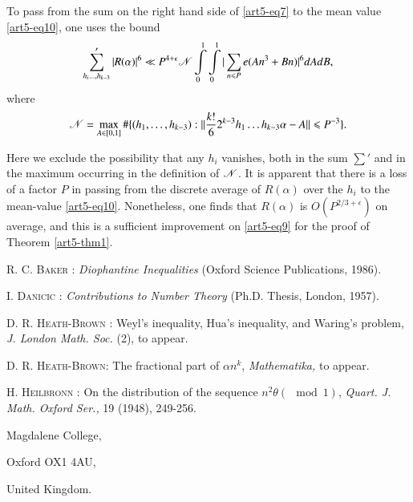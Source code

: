 To pass from the sum on the right hand side of \eqref{art5-eq7} to the mean value \eqref{art5-eq10}, one uses the bound
$$
\sum\limits'_{h_i \ldots, h_{k-3}} |R(\alpha)|^6 \ll P^{4 +\epsilon} \mathscr{N} \int\limits^1_0 \int\limits^1_0 |\sum\limits_{n\leqslant P} e (An^3 + Bn)|^6 d A d B,
$$
where 
$$
\mathscr{N} = \max\limits_{A \in [0,1]} \# \{(h_1, \ldots, h_{k-3}) : ||\frac{k!}{6} 2^{k-3} h_1\ldots h_{k-3} \alpha -A|| \leqslant P^{-3}\} .
$$

Here we exclude the possibility that any $h_i$ vanishes, both in the sum $\sum'$ and in the maximum occurring in the definition of $\mathscr{N}$. It is apparent that there is a loss of a factor $P$ in passing from the discrete average of $R(\alpha)$ over the $h_i$ to the mean-value \eqref{art5-eq10}. Nonetheless, one finds that $R(\alpha)$ is $O(P^{2/3 + \epsilon})$ on average, and this is a sufficient improvement on \eqref{art5-eq9} for the proof of Theorem \ref{art5-thm1}.

\begin{thebibliography}{99}
 \textsc{R. C. Baker} : \textit{Diophantine Inequalities} (Oxford Science Publications, 1986).

 \textsc{I. Danicic} : \textit{Contributions to Number Theory} (Ph.D. Thesis, London, 1957).

 \textsc{D. R. Heath-Brown}  : Weyl's inequality, Hua's inequality, and Waring's problem, \textit{J. London Math. Soc.} (2), to appear.

 \textsc{D. R. Heath-Brown}\pageoriginale : The fractional part of $\alpha n^k$, \textit{Mathematika,} to appear. 

 \textsc{H. Heilbronn} : On the distribution of the sequence $n^2 \theta (\mod 1)$, \textit{Quart. J. Math. Oxford Ser.,} 19 (1948), 249-256.
\end{thebibliography}

\medskip
\noindent
{\small Magdalene College,}

\noindent
{\small Oxford OX1 4AU,}

\noindent
{\small United Kingdom.}


